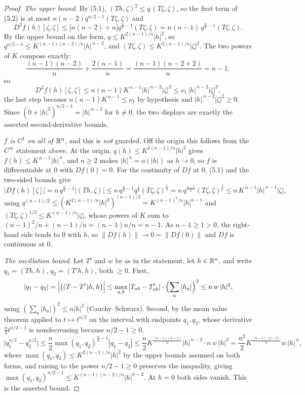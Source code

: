 \begin{proof}
\emph{The upper bound.}  By (5.1), $(Th,\zeta)^2\le q\,(T\zeta,\zeta)$, so the
first term of (5.2) is at most $n(n-2)q^{n/2-1}(T\zeta,\zeta)$ and
\[
D^2f(h)[\zeta,\zeta]\le\bigl[n(n-2)+n\bigr]q^{\frac n2-1}(T\zeta,\zeta)
=n(n-1)\,q^{\frac n2-1}(T\zeta,\zeta).
\]
By the upper bound on the form, $q\le K^{2(n-1)/n}|h|^2$, so
$q^{n/2-1}\le K^{(n-1)(n-2)/n}|h|^{\,n-2}$, and
$(T\zeta,\zeta)\le K^{2(n-1)/n}|\zeta|^2$.  The two powers of $K$
compose exactly:
\[
\frac{(n-1)(n-2)}n+\frac{2(n-1)}n=\frac{(n-1)(n-2+2)}n=n-1,
\]
so
\[
D^2f(h)[\zeta,\zeta]\le n(n-1)K^{\,n-1}|h|^{\,n-2}|\zeta|^2
\le \nu_1\,|h|^{\,n-2}|\zeta|^2 ,
\]
the last step because $n(n-1)K^{\,n-1}\le\nu_1$ by hypothesis and
$|h|^{\,n-2}|\zeta|^2\ge0$.  Since $(0+|h|^2)^{n/2-1}=|h|^{\,n-2}$ for
$h\ne0$, the two displays are exactly the asserted second-derivative bounds.

\emph{$f$ is $C^1$ on all of $\mathbb{R}^n$}, and this is \emph{not} guarded.  Off the
origin this follows from the $C^\infty$ statement above.  At the origin,
$q(h)\le K^{2(n-1)/n}|h|^2$ gives $f(h)\le K^{\,n-1}|h|^{\,n}$, and $n\ge2$
makes $|h|^{\,n}=o(|h|)$ as $h\to0$, so $f$ is differentiable at $0$ with
$Df(0)=0$.  For the continuity of $Df$ at $0$, (5.1) and the two-sided bounds
give
\[
|Df(h)[\zeta]|=n\,q^{\frac n2-1}|(Th,\zeta)|
\le n\,q^{\frac n2-1}q^{\frac12}(T\zeta,\zeta)^{\frac12}
=n\,q^{\frac{n-1}2}(T\zeta,\zeta)^{\frac12}
\le n\,K^{\,n-1}|h|^{\,n-1}|\zeta| ,
\]
using $q^{(n-1)/2}\le(K^{2(n-1)/n}|h|^2)^{(n-1)/2}=K^{(n-1)^2/n}|h|^{n-1}$ and
$(T\zeta,\zeta)^{1/2}\le K^{(n-1)/n}|\zeta|$, whose powers of $K$ sum to
$(n-1)^2/n+(n-1)/n=(n-1)n/n=n-1$.  As $n-1\ge1>0$, the right-hand side tends to
$0$ with $h$, so $\|Df(h)\|\to0=\|Df(0)\|$ and $Df$ is continuous at $0$.

\emph{The oscillation bound.}  Let $T'$ and $w$ be as in the statement, let
$h\in\mathbb{R}^n$, and write $q_1=(Th,h)$, $q_2=(T'h,h)$, both $\ge0$.  First,
\[
|q_1-q_2|=\Bigl|\bigl((T-T')h,h\bigr)\Bigr|
\le\max_{a,b}|T_{ab}-T'_{ab}|\cdot\Bigl(\sum_a|h_a|\Bigr)^2
\le n\,w\,|h|^2,
\]
using $(\sum_a|h_a|)^2\le n|h|^2$ (Cauchy--Schwarz).  Second, by the mean value
theorem applied to $t\mapsto t^{n/2}$ on the interval with endpoints $q_1,q_2$,
whose derivative $\tfrac n2t^{n/2-1}$ is nondecreasing because $n/2-1\ge0$,
\[
\bigl|q_1^{n/2}-q_2^{n/2}\bigr|
\le\frac n2\max(q_1,q_2)^{\frac n2-1}|q_1-q_2|
\le\frac n2K^{\frac{(n-1)(n-2)}n}|h|^{\,n-2}\cdot n\,w\,|h|^2
=\frac{n^2}2K^{\frac{(n-1)(n-2)}n}w\,|h|^{\,n},
\]
where $\max(q_1,q_2)\le K^{2(n-1)/n}|h|^2$ by the upper bounds assumed on both
forms, and raising to the power $n/2-1\ge0$ preserves the inequality, giving
$\max(q_1,q_2)^{n/2-1}\le K^{(n-1)(n-2)/n}|h|^{n-2}$.  At $h=0$ both sides
vanish.  This is the asserted bound.
\end{proof}
